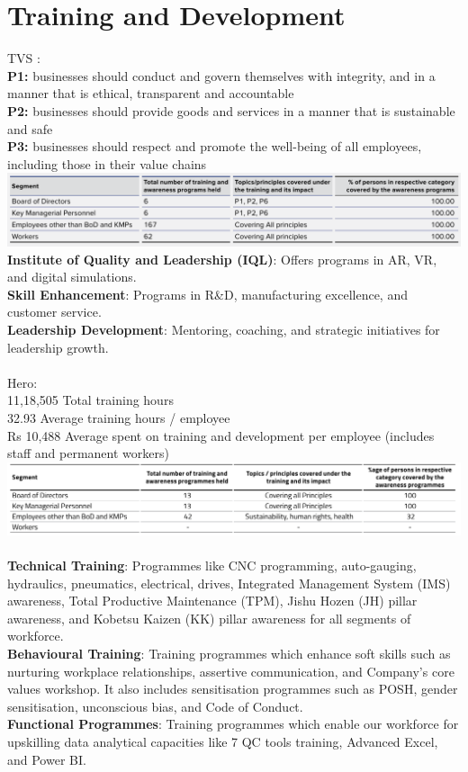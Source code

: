 \section{Training and Development}
TVS : \\
\textbf{P1:} businesses should conduct and govern themselves with integrity, and in a manner that is ethical, transparent and accountable \\\textbf{P2:} businesses should provide goods and services in a manner that is sustainable and safe \\\textbf{P3:} businesses should respect and promote the well-being of all employees, including those in their value chains\\
\includegraphics[width=\linewidth]{psycho_images/TVS_Training.png}\\
\textbf{Institute of Quality and Leadership (IQL)}: Offers programs in AR, VR, and digital simulations.\\
\textbf{Skill Enhancement}: Programs in R\&D, manufacturing excellence, and customer service.\\
\textbf{Leadership Development}: Mentoring, coaching, and strategic initiatives for leadership growth.\\\\
Hero: \\
11,18,505 Total training hours\\
32.93 Average training hours / employee\\
Rs 10,488 Average spent on training and development per employee (includes staff and permanent workers)\\
\includegraphics[width=\linewidth]{psycho_images/Hero_Training.png}\\\\
\textbf{Technical Training}: Programmes like CNC programming, auto-gauging, hydraulics, pneumatics, electrical, drives,	Integrated Management System (IMS) awareness, Total Productive Maintenance (TPM), Jishu Hozen (JH) pillar	awareness, and Kobetsu Kaizen (KK) pillar awareness for all segments of workforce.\\	
\textbf{Behavioural Training}: Training programmes which enhance
soft skills such as nurturing workplace relationships,
assertive communication, and Company’s core values
workshop. It also includes sensitisation programmes such
as POSH, gender sensitisation, unconscious bias, and
Code of Conduct.\\
\textbf{Functional Programmes}: Training programmes which
enable our workforce for upskilling data analytical
capacities like 7 QC tools training, Advanced Excel,
and Power BI.